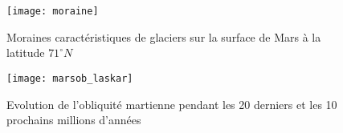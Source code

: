 \documentclass[11pt,a4paper]{article}
\begin{document}
\begin{figure}[h!]
\begin{center}
\texttt{[image: moraine]}
\caption{Moraines caractéristiques de glaciers sur la surface de Mars à la latitude $71^\circ N$ \citep{Kres:11}}
\label{moraine}
\end{center}
\end{figure}

\begin{figure}[h!]
\begin{center}
\texttt{[image: marsob\_laskar]}
\caption{Evolution de l'obliquité martienne pendant les 20 derniers et les 10 prochains millions d'années \citep{Lask:04}}
\label{marsob}
\end{center}
\end{figure}
\end{document}
